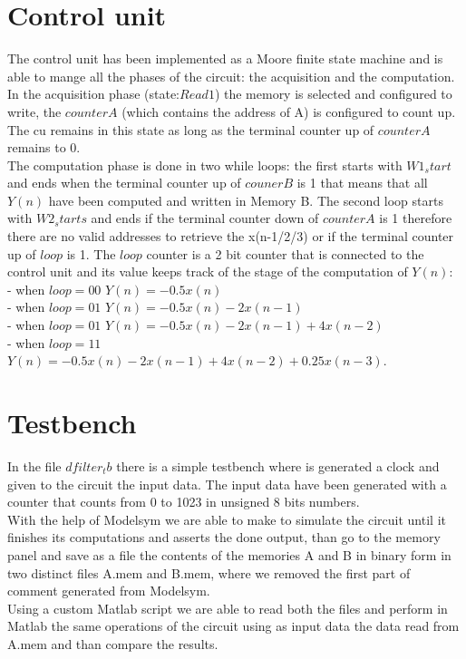\documentclass[12pt]{article}
\begin{document}
\section*{Control unit}
The control unit has been implemented as a Moore finite state machine and is able to mange all the phases of the circuit: the acquisition and the computation.   \\
In the acquisition phase (state:$Read1$) the memory is selected and configured to write, the $counterA$ (which contains the address of A) is configured to count up. The cu remains in this state as long as the terminal counter up of $counterA$ remains to 0. \\
The computation phase is done in two while loops: the first starts with $W1_start$ and ends when the terminal counter up of $couner B$ is 1 that means that all $Y(n)$ have been computed and written in Memory B. The second loop starts with $W2_starts$ and ends if the terminal counter down of $counterA$ is 1 therefore there are no valid addresses to retrieve the x(n-1/2/3) or if the terminal counter up of $loop$ is 1. The $loop$ counter is a 2 bit counter that is connected to the control unit and its value keeps track of the stage of the computation of $Y(n)$:\\
- when $loop=00$ $Y(n)=-0.5x(n)$ \\
- when $loop=01$ $Y(n)=-0.5x(n)-2x(n-1)$\\
- when $loop=01$ $Y(n)=-0.5x(n)-2x(n-1)+4x(n-2)$\\
- when $loop=11$ $Y(n)=-0.5x(n)-2x(n-1)+4x(n-2)+0.25x(n-3)$.\\

\section*{Testbench}
In the file $dfilter_tb$ there is a simple testbench where is generated a clock and given to the circuit the input data. The input data have been generated with a counter that counts from 0 to 1023 in unsigned 8 bits numbers. \\
With the help of Modelsym we are able to make to simulate the circuit until it finishes its computations and asserts the done output, than go to the memory panel and save as a file the contents of the memories A and B in binary form in two distinct files A.mem and B.mem, where we removed the first part of comment generated from Modelsym. \\
Using a custom Matlab script we are able to read both the files and perform in Matlab the same operations of the circuit using as input data the data read from A.mem and than compare the results. 
\end{document}
